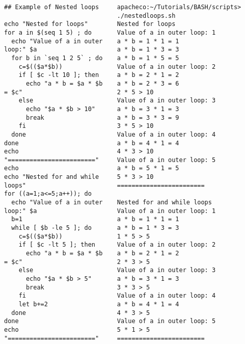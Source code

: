 \documentclass[slidestop,mathserif,compress,xcolor=svgnames]{beamer}
\begin{document}
\begin{frame}
{\begin{columns}
\begin{verbatim}
## Example of Nested loops

echo "Nested for loops"
for a in $(seq 1 5) ; do
  echo "Value of a in outer loop:" $a
  for b in `seq 1 2 5` ; do
    c=$(($a*$b))
    if [ $c -lt 10 ]; then
      echo "a * b = $a * $b = $c"
    else
      echo "$a * $b > 10"
      break
    fi
  done
done
echo "========================"
echo
echo "Nested for and while loops"
for ((a=1;a<=5;a++)); do
  echo "Value of a in outer loop:" $a
  b=1
  while [ $b -le 5 ]; do
    c=$(($a*$b))
    if [ $c -lt 5 ]; then
      echo "a * b = $a * $b = $c"
    else
      echo "$a * $b > 5"
      break
    fi
    let b+=2
  done
done
echo "========================"
      \end{verbatim}
      \column{5cm}
      \begin{verbatim}
apacheco:~/Tutorials/BASH/scripts> ./nestedloops.sh 
Nested for loops
Value of a in outer loop: 1
a * b = 1 * 1 = 1
a * b = 1 * 3 = 3
a * b = 1 * 5 = 5
Value of a in outer loop: 2
a * b = 2 * 1 = 2
a * b = 2 * 3 = 6
2 * 5 > 10
Value of a in outer loop: 3
a * b = 3 * 1 = 3
a * b = 3 * 3 = 9
3 * 5 > 10
Value of a in outer loop: 4
a * b = 4 * 1 = 4
4 * 3 > 10
Value of a in outer loop: 5
a * b = 5 * 1 = 5
5 * 3 > 10
========================

Nested for and while loops
Value of a in outer loop: 1
a * b = 1 * 1 = 1
a * b = 1 * 3 = 3
1 * 5 > 5
Value of a in outer loop: 2
a * b = 2 * 1 = 2
2 * 3 > 5
Value of a in outer loop: 3
a * b = 3 * 1 = 3
3 * 3 > 5
Value of a in outer loop: 4
a * b = 4 * 1 = 4
4 * 3 > 5
Value of a in outer loop: 5
5 * 1 > 5
========================
      \end{verbatim}
    \end{columns}
  }
\end{frame}
\end{document}
